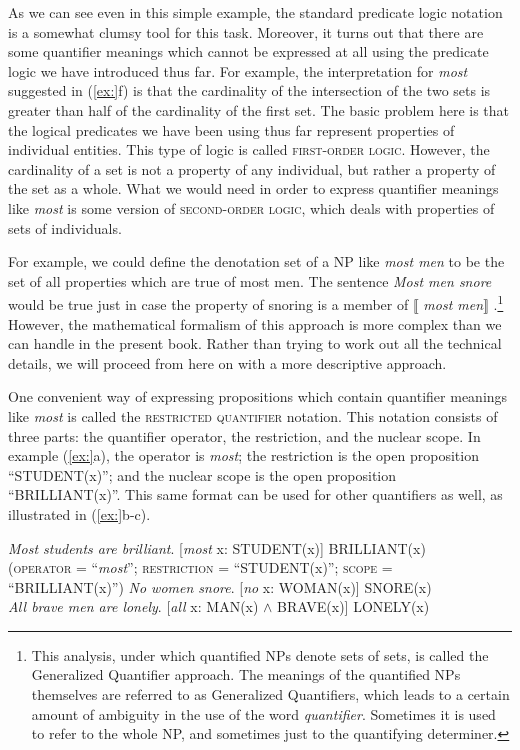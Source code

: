 As we can see even in this simple example, the standard predicate logic notation is a somewhat clumsy tool for this task. Moreover, it turns out that there are some quantifier meanings which cannot be expressed at all using the predicate logic we have introduced thus far. For example, the interpretation for \textit{most} suggested in (\ref{ex:}f) is that the cardinality of the intersection of the two sets is greater than half of the cardinality of the first set. The basic problem here is that the logical predicates we have been using thus far represent properties of individual entities. This type of logic is called \textsc{first-order logic}. However, the cardinality of a set is not a property of any individual, but rather a property of the set as a whole. What we would need in order to express quantifier meanings like \textit{most} is some version of \textsc{second-order logic}, which deals with properties of sets of individuals.



For example, we could define the denotation set of a NP like \textit{most men} to be the set of all properties which are true of most men. The sentence \textit{Most men snore} would be true just in case the property of snoring is a member of $\llbracket$ \textit{most men}$\rrbracket$ .\footnote{This analysis, under which quantified NPs denote sets of sets, is called the Generalized Quantifier approach. The meanings of the quantified NPs themselves are referred to as Generalized Quantifiers, which leads to a certain amount of ambiguity in the use of the word \textit{quantifier}. Sometimes it is used to refer to the whole NP, and sometimes just to the quantifying determiner.} However, the mathematical formalism of this approach is more complex than we can handle in the present book. Rather than trying to work out all the technical details, we will proceed from here on with a more descriptive approach.



One convenient way of expressing propositions which contain quantifier meanings like \textit{most} is called the \textsc{restricted quantifier} notation. This notation consists of three parts: the quantifier operator, the restriction, and the nuclear scope. In example (\ref{ex:}a), the operator is \textit{most}; the restriction is the open proposition “STUDENT(x)”; and the nuclear scope is the open proposition “BRILLIANT(x)”. This same format can be used for other quantifiers as well, as illustrated in (\ref{ex:}b-c).


\ea
\ea \textit{Most students are brilliant}.  [\textit{most} x: STUDENT(x)] BRILLIANT(x)\\
\textsc{(operator} = “\textit{most}”; \textsc{restriction} = “STUDENT(x)”; \textsc{scope} = “BRILLIANT(x)”)
\ex  \textit{No women snore}.  [\textit{no} x: WOMAN(x)] SNORE(x)\\
\ex \textit{All brave men are lonely}.  [\textit{all} x: MAN(x) $\wedge$ BRAVE(x)] LONELY(x)
\z \z


